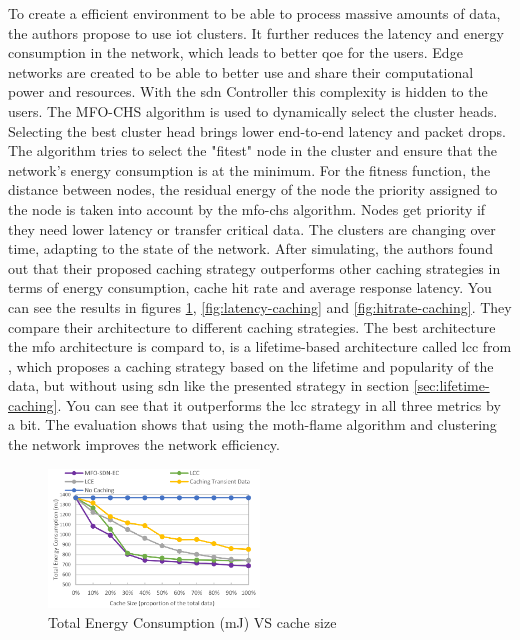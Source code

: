 \documentclass[conference]{IEEEtran}
\begin{document}
	To create a efficient environment to be able to process massive amounts of data, the authors propose to use \ac{iot} clusters. It further reduces the latency and energy consumption in the network, which leads to better \ac{qoe} for the users. Edge networks are created to be able to better use and share their computational power and resources. With the \ac{sdn} Controller this complexity is hidden to the users. The MFO-CHS algorithm is used to dynamically select the cluster heads. Selecting the best cluster head brings lower end-to-end latency and packet drops. The algorithm tries to select the "fitest" node in the cluster and ensure that the network's energy consumption is at the minimum. For the fitness function, the distance between nodes, the residual energy of the node the priority assigned to the node is taken into account by the \ac{mfo-chs} algorithm. Nodes get priority if they need lower latency or transfer critical data. The clusters are changing over time, adapting to the state of the network. After simulating, the authors found out that their proposed caching strategy outperforms other caching strategies in terms of energy consumption, cache hit rate and average response latency. You can see the results in figures \ref{fig:energy-caching}, \ref{fig:latency-caching} and \ref{fig:hitrate-caching}. They compare their architecture to different caching strategies. The best architecture the \ac{mfo} architecture is compard to, is a lifetime-based architecture called \ac{lcc} from \cite{caching-6}, which proposes a caching strategy based on the lifetime and popularity of the data, but without using \ac{sdn} like the presented strategy \cite{caching-2} in section \ref{sec:lifetime-caching}. You can see that it outperforms the \ac{lcc} strategy in all three metrics by a bit. The evaluation shows that using the moth-flame algorithm and clustering the network improves the network efficiency.

	\begin{figure}
		\centering
		\includegraphics[width=0.5\textwidth]{figures/energy-caching.png}
		\caption{Total Energy Consumption (mJ) VS cache size \cite{caching-1}}
		\label{fig:energy-caching}
	\end{figure}
\end{document}
